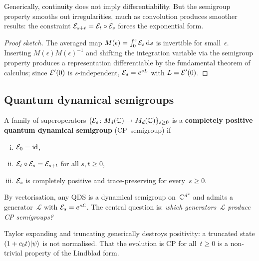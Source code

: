 \begin{intuition}
  Generically, continuity does not imply differentiability.  But
  the semigroup property smooths out irregularities, much as
  convolution produces smoother results: the constraint
  $\mathcal{E}_{s+t} = \mathcal{E}_t \circ \mathcal{E}_s$ forces the exponential form.
\end{intuition}

\begin{proof}[Proof sketch]
  The averaged map $M(\epsilon) = \int_0^\epsilon \mathcal{E}_s\,\mathrm{d} s$ is
  invertible for small~$\epsilon$.  Inserting
  $M(\epsilon)M(\epsilon)^{-1}$ and shifting the integration
  variable via the semigroup property produces a representation
  differentiable by the fundamental theorem of calculus; since
  $\mathcal{E}'(0)$ is $s$-independent, $\mathcal{E}_s = e^{sL}$ with
  $L = \mathcal{E}'(0)$.
\end{proof}

\subsection{Quantum dynamical semigroups}\label{sec:qds}

\begin{definition}%
\label{def:qds}
  A family of superoperators
  $\{\mathcal{E}_s\colon M_{d}(\mathbb{C}) \to M_{d}(\mathbb{C})\}_{s \geq 0}$ is a
  \textbf{completely positive quantum dynamical semigroup}
  (CP~semigroup) if
  \begin{enumerate}[(i)]
    \item $\mathcal{E}_0 = \operatorname{id}$,
    \item $\mathcal{E}_t \circ \mathcal{E}_s = \mathcal{E}_{s+t}$ for all
      $s,t \geq 0$,
    \item $\mathcal{E}_s$ is completely positive and trace-preserving
      for every~$s \geq 0$.
  \end{enumerate}
\end{definition}

By vectorisation, any QDS is a dynamical semigroup on~$\mathbb{C}^{d^2}$
and admits a generator~$\mathcal{L}$ with
$\mathcal{E}_s = e^{s\mathcal{L}}$.  The central question is:
\emph{which generators~$\mathcal{L}$ produce CP semigroups?}

\begin{intuition}
  Taylor expanding and truncating generically destroys positivity:
  a truncated state $(1 + c_0 t)\lvert \psi \rangle$ is not normalised.
  That the evolution is CP for all~$t \geq 0$ is a non-trivial
  property of the Lindblad form.
\end{intuition}

